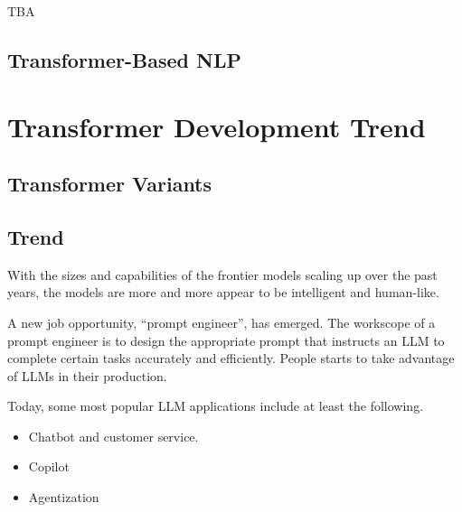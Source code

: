 TBA

\subsection{Transformer-Based NLP}

\section{Transformer Development Trend}

\subsection{Transformer Variants}

\subsection{Trend}

With the sizes and capabilities of the frontier models scaling up over the past years, the models are more and more appear to be intelligent and human-like. 

A new job opportunity, ``prompt engineer'', has emerged. The workscope of a prompt engineer is to design the appropriate prompt that instructs an LLM to complete certain tasks accurately and efficiently. People starts to take advantage of LLMs in their production. 

Today, some most popular LLM applications include at least the following.
\begin{itemize}
  \item Chatbot and customer service.
  \item Copilot
  \item Agentization
\end{itemize} 